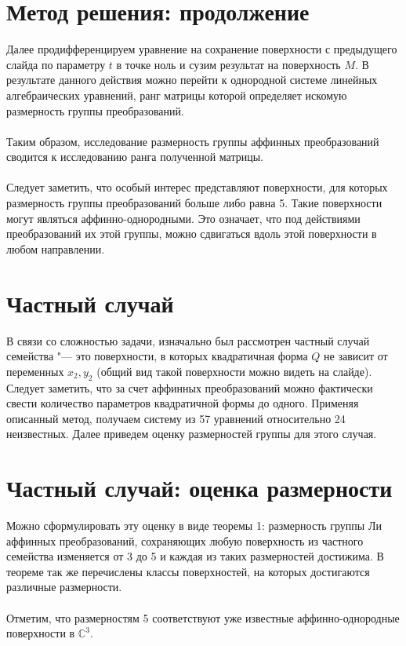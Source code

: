 \documentclass[a4paper,14pt]{extarticle}
\begin{document}
\section{Метод решения: продолжение}
Далее продифференцируем уравнение на сохранение поверхности с предыдущего слайда по параметру $t$ в точке ноль и сузим результат на поверхность $M$. В результате данного действия можно перейти к однородной системе линейных алгебраических уравнений, ранг матрицы которой определяет искомую размерность группы преобразований.
\\~\\
Таким образом, исследование размерность группы аффинных преобразований сводится к исследованию ранга полученной матрицы.
\\~\\
Следует заметить, что особый интерес представляют поверхности, для которых размерность группы преобразований больше либо равна 5. Такие поверхности могут являться аффинно-однородными. Это означает, что под действиями преобразований их этой группы, можно сдвигаться вдоль этой поверхности в любом направлении.

\section{Частный случай}
В связи со сложностью задачи, изначально был рассмотрен частный случай семейства "--- это поверхности, в которых квадратичная форма $Q$ не зависит от переменных $x_2, y_2$ (общий вид такой поверхности можно видеть на слайде). Следует заметить, что за счет аффинных преобразований можно фактически свести количество параметров квадратичной формы до одного. Применяя описанный метод, получаем систему из 57 уравнений относительно 24 неизвестных. Далее приведем оценку размерностей группы для этого случая.

\section{Частный случай: оценка размерности}
Можно сформулировать эту оценку в виде теоремы 1: размерность группы Ли аффинных преобразований, сохраняющих любую поверхность из частного семейства изменяется от 3 до 5 и каждая из таких размерностей достижима. В теореме так же перечислены классы поверхностей, на которых достигаются различные размерности.
\\~\\
Отметим, что размерностям 5 соответствуют уже известные аффинно-однородные поверхности в $\mathbb{C}^3$.
\end{document}
